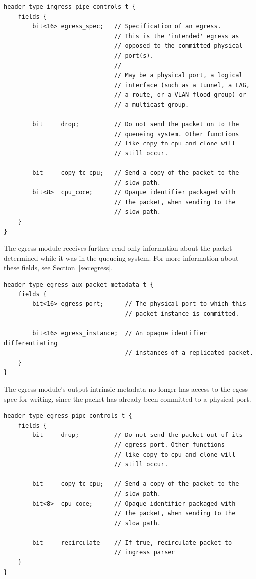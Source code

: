 \documentclass[12pt]{article}
\begin{document}
\begin{lstlisting}[style=P4style]
header_type ingress_pipe_controls_t {
    fields {
        bit<16> egress_spec;   // Specification of an egress.
                               // This is the 'intended' egress as
                               // opposed to the committed physical
                               // port(s).
                               //
                               // May be a physical port, a logical
                               // interface (such as a tunnel, a LAG,
                               // a route, or a VLAN flood group) or
                               // a multicast group.

        bit     drop;          // Do not send the packet on to the
                               // queueing system. Other functions
                               // like copy-to-cpu and clone will
                               // still occur.

        bit     copy_to_cpu;   // Send a copy of the packet to the
                               // slow path.
        bit<8>  cpu_code;      // Opaque identifier packaged with
                               // the packet, when sending to the
                               // slow path.
    }
}
\end{lstlisting}

The egress module receives further read-only information about the packet
determined while it was in the queueing system. For more information about
these fields, see Section~\ref{sec:egress}.

\begin{lstlisting}[style=P4style]
header_type egress_aux_packet_metadata_t {
    fields {
        bit<16> egress_port;      // The physical port to which this
                                  // packet instance is committed.

        bit<16> egress_instance;  // An opaque identifier differentiating
                                  // instances of a replicated packet.
    }
}
\end{lstlisting}

The egress module's output intrinsic metadata no longer has access to the egess
spec for writing, since the packet has already been committed to a physical
port.

\begin{lstlisting}[style=P4style]
header_type egress_pipe_controls_t {
    fields {
        bit     drop;          // Do not send the packet out of its
                               // egress port. Other functions
                               // like copy-to-cpu and clone will
                               // still occur.

        bit     copy_to_cpu;   // Send a copy of the packet to the
                               // slow path.
        bit<8>  cpu_code;      // Opaque identifier packaged with
                               // the packet, when sending to the
                               // slow path.

        bit     recirculate    // If true, recirculate packet to
                               // ingress parser
    }
}
\end{lstlisting}
\end{document}
